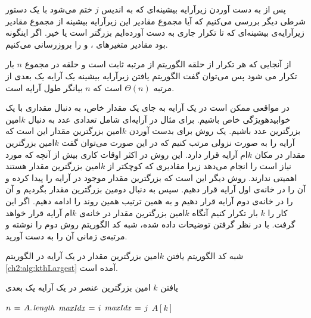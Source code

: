 پس از به دست آوردن زیرآرایه بیشینه‌ای که به اندیس {$j$} ختم می‌شود با یک دستور شرطی دیگر بررسی می‌کنیم که آیا مجموع مقادیر این زیرآرایه بیشینه از مجموع مقادیر زیرآرایه‌‌ی بیشینه‌ای که تا تکرار جاری به دست آورده‌ایم بزرگتر است یا خیر. اگر اینگونه بود مقادیر متغیرهای {}، {} و {} را بروزرسانی می‌کنیم.

از آنجایی که هر تکرار از حلقه الگوریتم {} از مرتبه ثابت است و حلقه در مجموع {$n$} بار تکرار می شود پس می‌توان گفت الگوریتم یافتن زیرآرایه بیشینه یک آرایه یک بعدی از مرتبه {$\Theta (n)$} است که {$n$} بیانگر طول آرایه است.

 در مواقعی ممکن است در یک آرایه به جای یک مقدار خاص، به دنبال مقداری با یک ‌خوابیده{ویژگی} خاص باشیم. برای مثال در آرایه‌ای شامل تعدادی عدد به دنبال {$k$}امین بزرگترین عدد باشیم. یک روش برای بدست آوردن {$k$}امین بزرگترین مقدار این است که آرایه را به صورت نزولی مرتب کنیم که در این صورت می‌توان گفت {$k$}امین بزرگترین مقدار در مکان {$k$}ام آرایه قرار دارد. این روش در اکثر اوقات کاری بیش از آنچه که مورد نیاز است را انجام می‌دهد زیرا مقادیری که کوچکتر از {$k$}امین بزرگترین مقدار هستند اهمیتی ندارند. روش دیگر این است که بزرگترین مقدار موجود در آرایه را پیدا کرده و  آن را در خانه‌ی اول آرایه قرار دهیم. سپس به دنبال دومین بزرگترین مقدار بگردیم و آن را در خانه‌ی دوم آرایه قرار دهیم و به همین ترتیب همین روند را ادامه دهیم. اگر این کار را {$k$} بار تکرار کنیم آنگاه {$k$}امین بزرگترین مقدار در خانه‌ی {$k$}ام آرایه قرار خواهد گرفت. با در نظر گرفتن توضیحات داده ‌شده، شبه کد الگوریتم روش دوم را نوشته و مرتبه‌ی زمانی آن را به دست آورید.


شبه کد الگوریتم یافتن {$k$}امین بزرگترین مقدار در یک آرایه در الگوریتم {\eqref{ch2:alg:kthLargest}} آمده است.

\begin{algorithm}
\caption{یافتن {$k$} امین بزرگترین عنصر در یک آرایه یک بعدی}\label{ch2:alg:kthLargest}
\begin{latin}
\begin{algorithmic}[1]
		\State	$n \mathrel{\hspace{1pt}=\hspace{1pt}} A.\hspace*{1pt}\mathit{length}$
				\State	$\mathit{maxIdx} \mathrel{\hspace{1pt}=\hspace{1pt}} i $
								\State	$\mathit{maxIdx} \mathrel{\hspace{1pt}=\hspace{1pt}} j$						
						\EndIf
				\EndFor
				\State	{}
		\EndFor
		\State	\Return $A[k]$
\EndFunction
\end{algorithmic}
\end{latin}
\end{algorithm}

